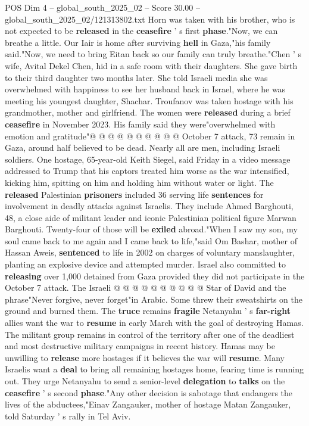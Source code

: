\begin{textsample}{POS Dim 4 – global\_south\_2025\_02 – Score 30.00 – global\_south\_2025\_02/121313802.txt}
Horn was taken with his brother, who is not expected to be \textbf{released} in the \textbf{ceasefire} ' s first \textbf{phase}."Now, we can breathe a little.
Our Iair is home after surviving \textbf{hell} in Gaza,"his family said."Now, we need to bring Eitan back so our family can truly breathe."Chen ' s wife, Avital Dekel Chen, hid in a safe room with their daughters.
She gave birth to their third daughter two months later.
She told Israeli media she was overwhelmed with happiness to see her husband back in Israel, where he was meeting his youngest daughter, Shachar.
Troufanov was taken hostage with his grandmother, mother and girlfriend.
The women were \textbf{released} during a brief \textbf{ceasefire} in November 2023.
His family said they were"overwhelmed with emotion and gratitude"@ @ @ @ @ @ @ @ @ @ October 7 attack, 73 remain in Gaza, around half believed to be dead.
Nearly all are men, including Israeli soldiers.
One hostage, 65-year-old Keith Siegel, said Friday in a video message addressed to Trump that his captors treated him worse as the war intensified, kicking him, spitting on him and holding him without water or light.
The \textbf{released} Palestinian \textbf{prisoners} included 36 serving life \textbf{sentences} for involvement in deadly attacks against Israelis.
They include Ahmed Barghouti, 48, a close aide of militant leader and iconic Palestinian political figure Marwan Barghouti.
Twenty-four of those will be \textbf{exiled} abroad."When I saw my son, my soul came back to me again and I came back to life,"said Om Bashar, mother of Hassan Aweis, \textbf{sentenced} to life in 2002 on charges of voluntary manslaughter, planting an explosive device and attempted murder.
Israel also committed to \textbf{releasing} over 1,000 detained from Gaza provided they did not participate in the October 7 attack.
The Israeli @ @ @ @ @ @ @ @ @ @ Star of David and the phrase"Never forgive, never forget"in Arabic.
Some threw their sweatshirts on the ground and burned them.
The \textbf{truce} remains \textbf{fragile} Netanyahu ' s \textbf{far-right} allies want the war to \textbf{resume} in early March with the goal of destroying Hamas.
The militant group remains in control of the territory after one of the deadliest and most destructive military campaigns in recent history.
Hamas may be unwilling to \textbf{release} more hostages if it believes the war will \textbf{resume}.
Many Israelis want a \textbf{deal} to bring all remaining hostages home, fearing time is running out.
They urge Netanyahu to send a senior-level \textbf{delegation} to \textbf{talks} on the \textbf{ceasefire} ' s second \textbf{phase}."Any other decision is sabotage that endangers the lives of the abductees,"Einav Zangauker, mother of hostage Matan Zangauker, told Saturday ' s rally in Tel Aviv.

\end{textsample}
